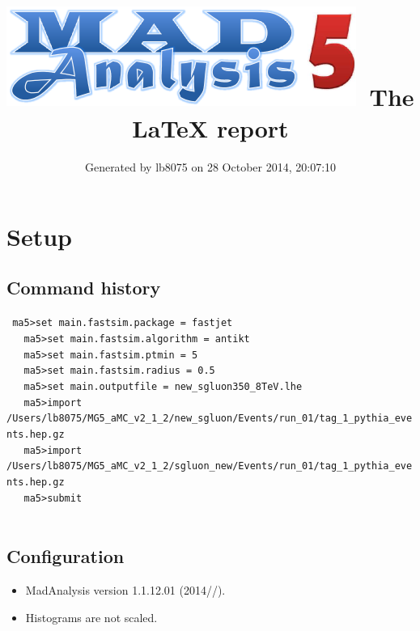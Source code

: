 \documentclass[a4paper, 11pt]{article}
\title{{\includegraphics[scale=.4]{logo.png}}\ The LaTeX report}
\author{Generated by lb8075 on 28 October 2014, 20:07:10}
\begin{document}
\maketitle
\flushbottom

\newpage
\section{ Setup}

\subsection{ Command history}

\texttt{ ma5>set main.fastsim.package = fastjet\\
}
\texttt{ }\texttt{ }\texttt{ ma5>set main.fastsim.algorithm = antikt\\
}
\texttt{ }\texttt{ }\texttt{ ma5>set main.fastsim.ptmin = 5\\
}
\texttt{ }\texttt{ }\texttt{ ma5>set main.fastsim.radius = 0.5\\
}
\texttt{ }\texttt{ }\texttt{ ma5>set main.outputfile = new\_sgluon350\_8TeV.lhe\\
}
\texttt{ }\texttt{ }\texttt{ ma5>import /\-Users/\-lb8075/\-MG5\_aMC\_v2\_1\_2/\-new\_sgluon/\-Events/\-run\_01/\-tag\_1\_pythia\_events.hep.gz\\
}
\texttt{ }\texttt{ }\texttt{ ma5>import /\-Users/\-lb8075/\-MG5\_aMC\_v2\_1\_2/\-sgluon\_new/\-Events/\-run\_01/\-tag\_1\_pythia\_events.hep.gz\\
}
\texttt{ }\texttt{ }\texttt{ ma5>submit\\
}
\texttt{ }\texttt{ }\subsection{ Configuration}

\begin{itemize}
  \item MadAnalysis version 1.1.12.01 (2014//).
   \item Histograms are not scaled.
 
\end{itemize}
\newpage
\end{document}
